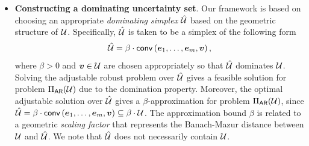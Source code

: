 \documentclass[11pt]{article}
\theoremstyle{plain}
\theoremstyle{definition}
\numberwithin{equation}{section}%
\numberwithin{equation}{section}%
\newcommand{\mb}[1]{\ensuremath{\boldsymbol{#1}}}
\newcommand*{\red}{\textcolor{black}}
\begin{document}
\begin{itemize}

\item[a)] {\bf Constructing a dominating uncertainty set}. Our framework is based on choosing an appropriate {\em dominating simplex } $\hat{\cal U}$ based on the geometric structure of ${\cal U}$. Specifically,  $\hat{\cal U}$ is taken to be a simplex of the following form
$$ \hat{\cal U} = \beta \cdot {\sf conv } \left( \mb e_1,\ldots,\mb e_m, \mb v \right), $$
where $\beta >0$ and $ \mb v \in {\cal U}$ are chosen appropriately so that $\hat{\cal U}$ dominates ${\cal U}$. Solving the adjustable robust problem over $\hat{\cal U}$ gives a feasible solution for problem $\Pi_{\sf AR}({\cal U})$ due to the domination property. Moreover, the optimal adjustable solution over $\hat{\cal U}$ gives a $\beta$-approximation for problem $\Pi_{\sf AR}({\cal U})$, since $\hat{\cal U} = \beta \cdot {\sf conv } \left( \mb e_1,\ldots,\mb e_m, \mb v \right) \subseteq \beta \cdot {\cal U}$. The approximation bound $\beta$  is related to a geometric {\em scaling factor} that represents the Banach-Mazur distance between ${\cal U}$ and $\hat{\cal U}$. We note that $\hat {\cal U}$ does not necessarily contain ${\cal U}$.
\ \\


\end{itemize}
\end{document}
